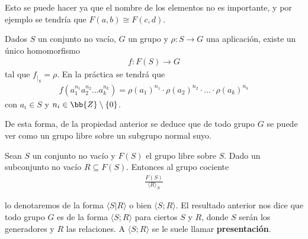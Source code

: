 \begin{observacion}
    Esto se puede hacer ya que el nombre de los elementos no es importante, y por ejemplo se tendría que $F(a,b)\cong F(c,d)$.
\end{observacion}

\begin{coro}
    Dados $S$ un conjunto no vacío, $G$ un grupo y $\rho : S \to G$ una aplicación, existe un único homomorfismo 
    \begin{gather*}
        f:F(S) \to G
    \end{gather*}
    tal que $f_{|_S}=\rho$. En la práctica se tendrá que 
    \begin{gather*}
        f(a_1^{n_1}a_2^{n_2}...a_k^{n_k}) = \rho(a_1)^{n_1} \cdot \rho(a_2)^{n_2} \cdot ... \cdot \rho(a_k)^{n_k} 
    \end{gather*}
    con $a_i\in S$ y $n_i\in \bb{Z}\setminus\{0\}$.
\end{coro}

\begin{observacion}
    De esta forma, de la propiedad anterior se deduce que de todo grupo $G$ se puede ver como un grupo libre sobre un subgrupo normal suyo.
\end{observacion}

\begin{definicion}
    Sean $S$ un conjunto no vacío y $F(S)$ el grupo libre sobre $S$. Dado un subconjunto no vacío $R\subseteq F(S)$. Entonces al grupo cociente
    \begin{gather*}
        \frac{F(S)}{\langle R \rangle_N}
    \end{gather*}
        
    lo denotaremos de la forma $\langle S | R \rangle$ o bien $\langle S;R \rangle$. El resultado anterior nos dice que todo grupo $G$ es de la forma $\langle S;R\rangle$ para ciertos $S$ y $R$, donde $S$ serán los generadores y $R$ las relaciones. A $\langle S;R \rangle$ se le suele llamar \textbf{presentación}.
\end{definicion}

